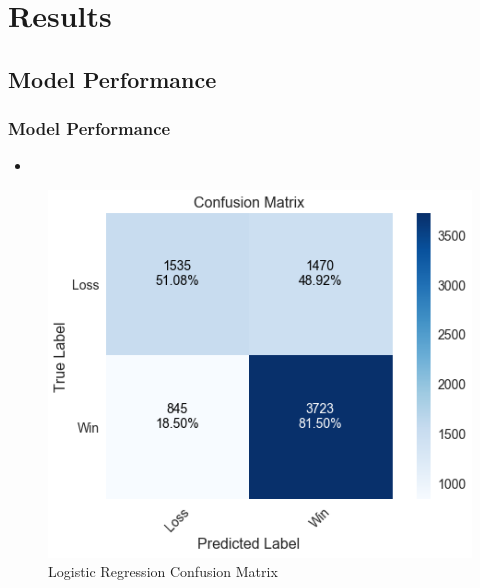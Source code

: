 \documentclass{beamer}
\begin{document}
\section{Results}

\subsection{Model Performance}
\begin{frame}
\frametitle{Model Performance}
\begin{itemize}
    \item
\end{itemize}
\begin{figure}
\includegraphics[scale=0.35]{../docs/assets/images/model-performance/logistic-regression-confusion-matrix.png}
\caption{Logistic Regression Confusion Matrix}
\end{figure}
\end{frame}
\end{document}
